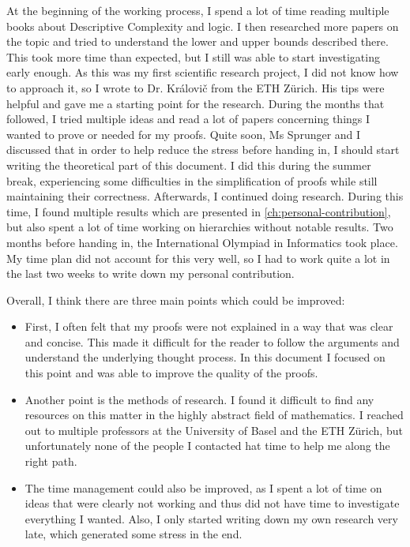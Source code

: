 At the beginning of the working process, I spend a lot of time reading multiple books about Descriptive Complexity and logic.
I then researched more papers on the topic and tried to understand the lower and upper bounds described there.
This took more time than expected, but I still was able to start investigating early enough.
As this was my first scientific research project, I did not know how to approach it, so I wrote to Dr. Královi\v{c} from the ETH Zürich.
His tips were helpful and gave me a starting point for the research.
During the months that followed, I tried multiple ideas and read a lot of papers concerning things I wanted to prove or needed for my proofs.
Quite soon, Ms Sprunger and I discussed that in order to help reduce the stress before handing in, I should start writing the theoretical part of this document.
I did this during the summer break, experiencing some difficulties in the simplification of proofs while still maintaining their correctness.
Afterwards, I continued doing research.
During this time, I found multiple results which are presented in \cref{ch:personal-contribution}, but also spent a lot of time working on hierarchies without notable results.
Two months before handing in, the International Olympiad in Informatics took place.
My time plan did not account for this very well, so I had to work quite a lot in the last two weeks to write down my personal contribution.

Overall, I think there are three main points which could be improved:
\begin{itemize}
    \setlength\itemsep{0.15em}
    \item First, I often felt that my proofs were not explained in a way that was clear and concise.
    This made it difficult for the reader to follow the arguments and understand the underlying thought process.
    In this document I focused on this point and was able to improve the quality of the proofs.
    \item Another point is the methods of research.
    I found it difficult to find any resources on this matter in the highly abstract field of mathematics.
    I reached out to multiple professors at the University of Basel and the ETH Zürich, but unfortunately none of the people I contacted hat time to help me along the right path.
    \item The time management could also be improved, as I spent a lot of time on ideas that were clearly not working and thus did not have time to investigate everything I wanted.
    Also, I only started writing down my own research very late, which generated some stress in the end.
\end{itemize}

